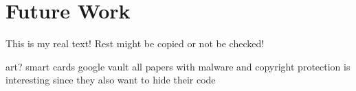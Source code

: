 \section{Future Work}\label{section:conclusion-future}
This is my real text! Rest might be copied or not be checked!


art?\newline
smart cards\newline
google vault\newline
all papers with malware and copyright protection is interesting since they also want to hide their code\newline
